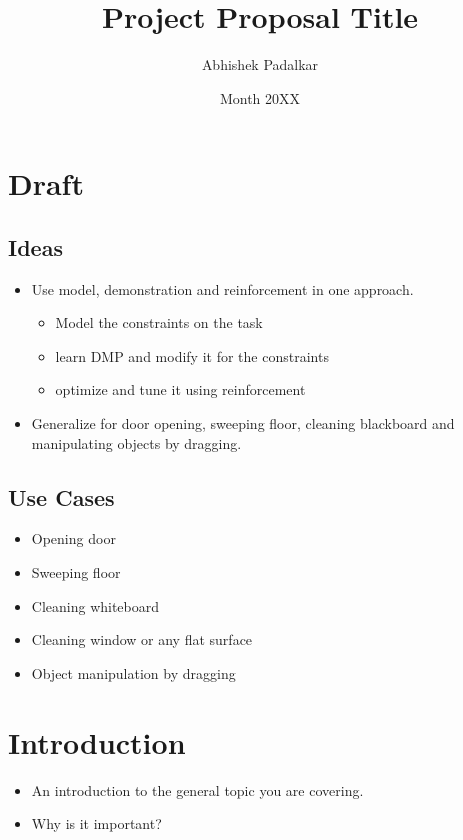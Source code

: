 \documentclass[thesis]{mas_proposal}
\title{Project Proposal Title}
\author{Abhishek Padalkar}
\date{Month 20XX}
\begin{document}
\maketitle

\pagestyle{plain}

\chapter{Draft}

\section{Ideas}
\begin{itemize}
	\item Use model, demonstration and reinforcement in one approach.
	\begin{itemize}
		\item Model the constraints on the task
		\item learn DMP and modify it for the constraints
		\item optimize and tune it using reinforcement
	\end{itemize}
	\item Generalize for door opening, sweeping floor, cleaning blackboard and manipulating objects by dragging.
\end{itemize}

\section{Use Cases}
\begin{itemize}
	\item Opening door
	\item Sweeping floor
	\item Cleaning whiteboard
	\item Cleaning window or any flat surface
	\item Object manipulation by dragging
\end{itemize}

\chapter{Introduction}
\begin{itemize}
    \item An introduction to the general topic you are covering.
    \item Why is it important?
\end{itemize}
\end{document}
